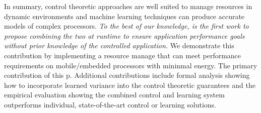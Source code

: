 In summary, control theoretic approaches are well suited to manage
resources in dynamic environments and machine learning techniques can
produce accurate models of complex processors.  \emph{To the best of
  our knowledge, \SYSTEM{} is the first work to propose combining the
  two at runtime to ensure application performance goals without prior
  knowledge of the controlled application.}  We demonstrate this
contribution by implementing a resource manage that can meet
performance requirements on mobile/embedded processors with mininmal
energy.  The primary contribution of this p.  Additional
contributions include formal analysis showing how to incorporate
learned variance into the control theoretic guarantees and the
empirical evaluation showing the combined control and learning system
outperforms individual, state-of-the-art control or learning
solutions.


